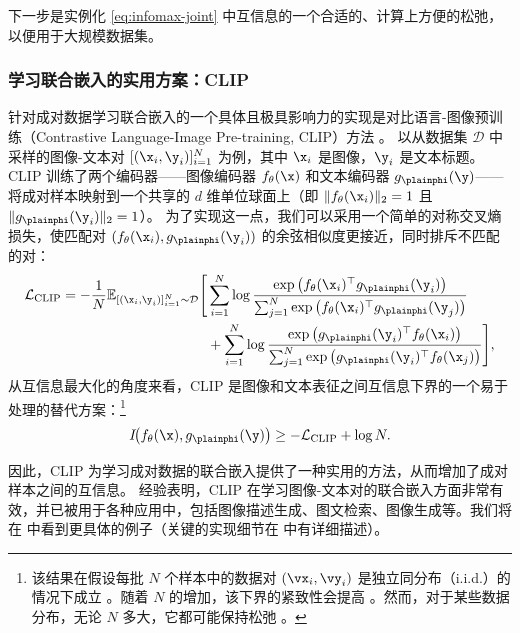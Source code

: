 \documentclass[../../book-main_zh.tex]{subfiles}
\begin{document}
下一步是实例化 \eqref{eq:infomax-joint} 中互信息的一个合适的、计算上方便的松弛，以便用于大规模数据集。
\subsubsection{学习联合嵌入的实用方案：CLIP}

针对成对数据学习联合嵌入的一个具体且极具影响力的实现是对比语言-图像预训练（Contrastive Language-Image Pre-training, CLIP）方法 \cite{radford2021learning}。
以从数据集 $\mathcal{D}$ 中采样的图像-文本对 $[(\x_i, \y_i)]_{i=1}^N$ 为例，其中 $\x_i$ 是图像，$\y_i$ 是文本标题。
CLIP 训练了两个编码器——图像编码器 $f_{\theta}(\x)$ 和文本编码器 $g_{\plainphi}(\y)$——将成对样本映射到一个共享的 $d$ 维单位球面上（即 $\|f_{\theta}(\x_i)\|_2 = 1$ 且 $\|g_{\plainphi}(\y_i)\|_2 = 1$）。
为了实现这一点，我们可以采用一个简单的对称交叉熵损失，使匹配对 $(f_{\theta}(\x_i),g_{\plainphi}(\y_i))$ 的余弦相似度更接近，同时排斥不匹配的对：
\begin{align}
    \mathcal{L}_{\mathrm{CLIP}} = -\frac{1}{N}\mathbb{E}_{[(\x_i,
        \y_i)]_{i=1}^N \sim
    \mathcal{D}} \Biggr[  &\sum_{i=1}^N\log \frac{\exp\left(
                f_{\theta}(\x_i)^\top g_{\plainphi}(\y_i)
        \right)}{\sum_{j=1}^N \exp\left( f_{\theta}(\x_i)^\top
        g_{\plainphi}(\y_j) \right)} \nonumber \\
        &+\sum_{i=1}^N\log \frac{\exp\left( g_{\plainphi}(\y_i)^\top
        f_{\theta}(\x_i) \right)}{\sum_{j=1}^N \exp\left(
    g_{\plainphi}(\y_i)^\top f_{\theta}(\x_j) \right)} \Biggr],
    \label{eq:clip-loss}
\end{align}
从互信息最大化的角度来看，CLIP 是图像和文本表征之间互信息下界的一个易于处理的替代方案：\footnote{该结果在假设每批 $N$ 个样本中的数据对 $(\vx_i, \vy_i)$ 是独立同分布（i.i.d.）的情况下成立 \cite[Lemma 1]{Oko2025-wk}。随着 $N$ 的增加，该下界的紧致性会提高 \cite{Van_den_Oord2018-qf}。然而，对于某些数据分布，无论 $N$ 多大，它都可能保持松弛 \cite{mcallester2019formal,10.5555/3524938.3525859}。}
\begin{equation}
    I\!\big(f_{\theta}(\x),g_{\plainphi}(\y)\big) \geq -
    \mathcal{L}_{\mathrm{CLIP}} + \log N.
\end{equation}

因此，CLIP 为学习成对数据的联合嵌入提供了一种实用的方法，从而增加了成对样本之间的互信息。
经验表明，CLIP 在学习图像-文本对的联合嵌入方面非常有效，并已被用于各种应用中，包括图像描述生成、图文检索、图像生成等。我们将在  中看到更具体的例子（关键的实现细节在  中有详细描述）。
\end{document}
